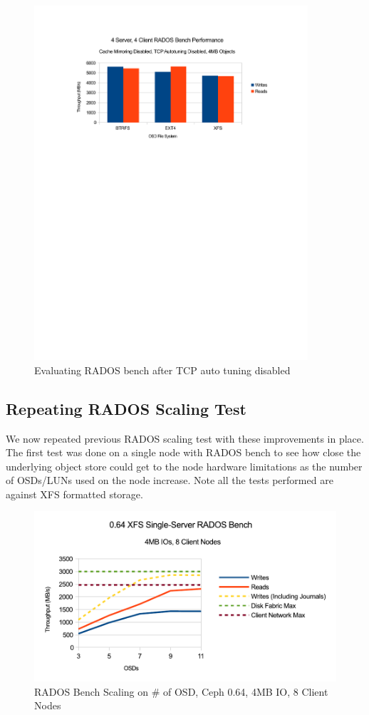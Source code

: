 \documentclass{article}
\begin{document}
\begin{figure}[htb]
\centering
\includegraphics[width=4.0in]{rados-after-ddn-tcptune}
\caption{Evaluating RADOS bench after TCP auto tuning disabled}
\label{fig:rados-tcp-auto-disabled}
\end{figure}




\subsection{Repeating RADOS Scaling Test}

We now repeated previous RADOS scaling test with these improvements in place.
The first test was done on a single node with RADOS bench to see how close the
underlying object store could get to the node hardware limitations as the number
of OSDs/LUNs used on the node increase. Note all the tests performed are against
XFS formatted storage.

\begin{figure}[htb]
\centering
\includegraphics[width=5in]{rados-064-osd}
\caption{RADOS Bench Scaling on \# of OSD, Ceph 0.64, 4MB IO, 8 Client Nodes}
\label{fig:rados-064-osd}
\end{figure}
\end{document}
